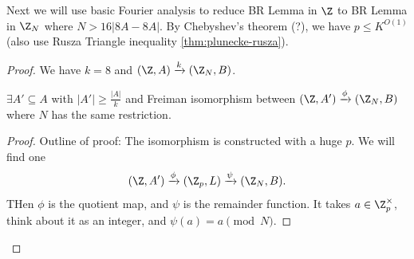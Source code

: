 \documentclass[a4paper]{article}
\begin{document}
Next we will use basic Fourier analysis to reduce BR Lemma in $\Z $ to BR Lemma in $\Z_N $ where $N > 16|8A-8A| $.
By Chebyshev's theorem (?), we have $p\le K^{O(1)}  $ (also use Rusza Triangle inequality \ref{thm:plunecke-rusza}).

\begin{proof}
	We have $k=8 $ and $(\Z,A) \xrightarrow{k} (\Z_N,B) $.
	\begin{lem}
		$\exists A' \subseteq A $ with $|A'| \ge \frac{|A|}{k} $ and Freiman isomorphism between $(\Z,A')\xrightarrow{\phi}(\Z_N,B) $ where $N $ has the same restriction.
	\end{lem}
	\begin{proof}
		Outline of proof:
		The isomorphism is constructed with a huge $p $.
		We will find one
		\[
			(\Z,A') \xrightarrow{\phi} (\Z_p,L)\xrightarrow{\psi} (\Z_N,B)
		.\]
		THen $\phi $ is the quotient map, and $\psi $ is the remainder function.
		It takes $a\in \Z_p^{\times}  $, think about it as an integer, and $\psi(a) = a\pmod{N} $.
	\end{proof}
\end{proof}
\end{document}
